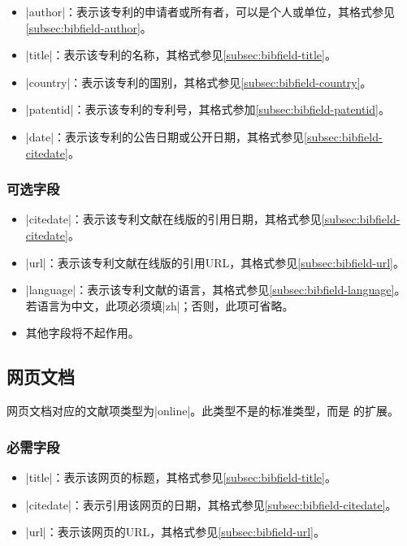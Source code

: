 \begin{itemize}
\item |author|：表示该专利的申请者或所有者，可以是个人或单位，其格式参见
  \ref{subsec:bibfield-author}。
\item |title|：表示该专利的名称，其格式参见\ref{subsec:bibfield-title}。
\item |country|：表示该专利的国别，其格式参见\ref{subsec:bibfield-country}。
\item |patentid|：表示该专利的专利号，其格式参加\ref{subsec:bibfield-patentid}。
\item |date|：表示该专利的公告日期或公开日期，其格式参见\ref{subsec:bibfield-citedate}。
\end{itemize}

\subsubsection{可选字段}

\begin{itemize}
\item |citedate|：表示该专利文献在线版的引用日期，其格式参见\ref{subsec:bibfield-citedate}。
\item |url|：表示该专利文献在线版的引用URL，其格式参见\ref{subsec:bibfield-url}。
\item |language|：表示该专利文献的语言，其格式参见\ref{subsec:bibfield-language}。
  若语言为中文，此项必须填|zh|；否则，此项可省略。
\item 其他字段将不起作用。
\end{itemize}

\subsection{网页文档}\label{subsec:bibtype-webpage}

网页文档对应的{\BibTeX}文献项类型为|online|。此类型不是{\BibTeX}的标准类型，而是
{\njuthesis}的扩展。

\subsubsection{必需字段}

\begin{itemize}
\item |title|：表示该网页的标题，其格式参见\ref{subsec:bibfield-title}。
\item |citedate|：表示引用该网页的日期，其格式参见\ref{subsec:bibfield-citedate}。
\item |url|：表示该网页的URL，其格式参见\ref{subsec:bibfield-url}。
\end{itemize}

